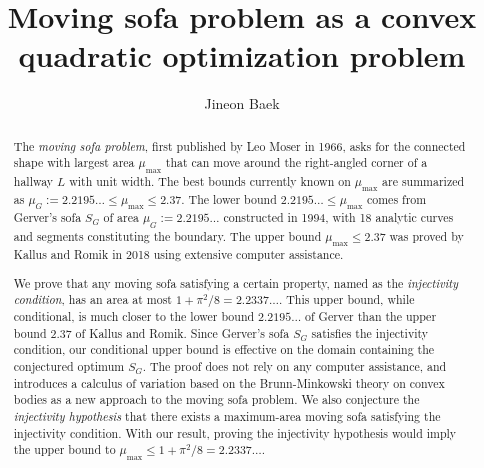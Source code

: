 \documentclass[10pt]{article}
\title{Moving sofa problem as a convex quadratic optimization problem}
\author{Jineon Baek}
\theoremstyle{plain}
\theoremstyle{definition}
\theoremstyle{remark}
\begin{document}
\maketitle
\tableofcontents

\begin{abstract}
The \emph{moving sofa problem}, first published by Leo Moser in 1966,
asks for the connected shape with largest area $\mu_{\text{max}}$ that can move around the
right-angled corner of a hallway $L$ with unit width.
The best bounds currently known on $\mu_{\max}$ are summarized as
$\mu_G := 2.2195\ldots \leq \mu_{\max} \leq 2.37$.
The lower bound $2.2195\ldots \leq \mu_{\max}$ comes from Gerver's sofa $S_G$ of area $\mu_G :=
2.2195\ldots$ constructed in 1994, with 18 analytic curves and segments constituting the boundary.
The upper bound $\mu_{\max} \leq 2.37$ was proved by Kallus and Romik in 2018
using extensive computer assistance.

We prove that any moving sofa satisfying a certain property, named as the
\emph{injectivity condition},
has an area at most $1 + \pi^2/8 =
2.2337\ldots$. This upper bound, while conditional, is much closer to the lower bound $2.2195\ldots$
of Gerver than the upper bound $2.37$ of Kallus and Romik. Since Gerver's sofa $S_G$ satisfies the
injectivity condition, our conditional upper bound is effective on the domain containing the
conjectured optimum $S_G$. The proof does not rely on any computer assistance, and introduces a
calculus of variation based on the Brunn-Minkowski theory on convex bodies as a new approach to the
moving sofa problem. We also conjecture the \emph{injectivity hypothesis}
that there exists a maximum-area moving sofa satisfying the injectivity
condition. With our result, proving the injectivity hypothesis would imply the upper bound
to $\mu_{\max} \leq 1 + \pi^2/8 = 2.2337\ldots$.
\end{abstract}



\printbibliography
\end{document}
